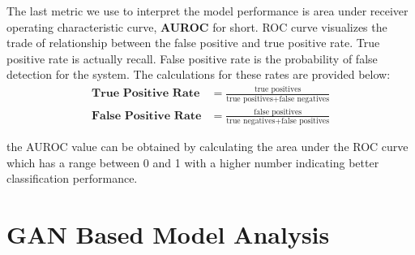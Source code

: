 The last metric we use to interpret the model performance is area under receiver operating characteristic 
curve, \textbf{AUROC} for short. ROC curve visualizes the trade of relationship between the false positive 
and true positive rate. True positive rate is actually recall. False positive rate is the probability 
of false detection for the system. The calculations for these rates are provided below:
\begin{align}
\textbf{True Positive Rate} & = \frac{\text{true positives}}{\text{true positives} + \text{false negatives}} \\[5pt]
\textbf{False Positive Rate} & = \frac{\text{false positives}}{\text{true negatives} + \text{false positives}}
\end{align}

the AUROC value can be obtained by calculating the area under the ROC curve which has a range between 0 and 1 with a higher number indicating better classification performance.

\section{GAN Based Model Analysis}

